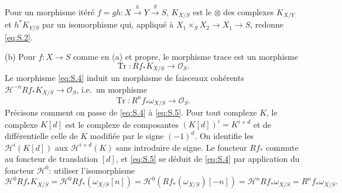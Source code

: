 \documentclass[12pt,a4paper]{article}
\theoremstyle{plain}
\theoremstyle{definition}
\theoremstyle{remark}
\DeclareMathOperator{\Tr}{Tr}
\newcommand{\OO}{\mathcal{O}}
\providecommand{\Tr}{\operatorname{Tr}}
\begin{document}
Pour un morphisme itéré $f=gh:X\xrightarrow{h}Y\xrightarrow{g}S$, $K_{X/S}$ est le
$\otimes$ des complexes $K_{X/Y}$ et $h^*K_{Y/S}$ par un isomorphisme qui, appliqué à
$X_1\times_S X_2\to X_1\to S$, redonne \eqref{eq:S.2}.

(b) Pour $f:X\to S$ comme en (a) et propre, le morphisme trace est un morphisme
\begin{equation}\label{eq:S.4}
\Tr:Rf_*K_{X/S}\to\OO_S.
\end{equation}
Le morphisme \eqref{eq:S.4} induit un morphisme de faisceaux cohérents
$\mathscr{H}^{-n}Rf_*K_{X/S}\to\OO_S$, i.e.\ un morphisme
\begin{equation}\label{eq:S.5}
\Tr:R^nf_*\omega_{X/S}\to\OO_S.
\end{equation}
Précisons comment on passe de \eqref{eq:S.4} à \eqref{eq:S.5}. Pour tout complexe
$K$, le complexe $K[d]$ est le complexe de composantes $(K[d])^i=K^{i+d}$ et de
différentielle celle de $K$ modifiée par le signe $(-1)^d$. On identifie les
$\mathscr{H}^i(K[d])$ aux $\mathscr{H}^{i+d}(K)$ sans introduire de signe. Le foncteur $Rf_*$
commute au foncteur de translation $[d]$, et \eqref{eq:S.5} se déduit de
\eqref{eq:S.4} par application du foncteur $\mathscr{H}^0$: utiliser l'isomorphisme
\[
\mathscr{H}^0 Rf_*K_{X/S}=\mathscr{H}^0 Rf_*(\omega_{X/S}[n])=\mathscr{H}^0(Rf_*(\omega_{X/S})[-n])
=\mathscr{H}^n Rf_*\omega_{X/S}=R^nf_*\omega_{X/S}.
\]
\end{document}
